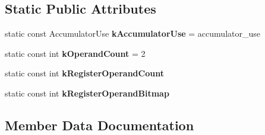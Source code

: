 \subsection*{Static Public Attributes}
\begin{DoxyCompactItemize}
\item 
static const Accumulator\+Use {\bfseries k\+Accumulator\+Use} = accumulator\+\_\+use\hypertarget{structv8_1_1internal_1_1interpreter_1_1_bytecode_traits_3_01accumulator__use_00_01operand__0_00_01operand__1_01_4_ae02e2452222dd06402907dcffd747ae4}{}\label{structv8_1_1internal_1_1interpreter_1_1_bytecode_traits_3_01accumulator__use_00_01operand__0_00_01operand__1_01_4_ae02e2452222dd06402907dcffd747ae4}

\item 
static const int {\bfseries k\+Operand\+Count} = 2\hypertarget{structv8_1_1internal_1_1interpreter_1_1_bytecode_traits_3_01accumulator__use_00_01operand__0_00_01operand__1_01_4_a8b8c6c8aadae9c3267245eef3e8ad1f2}{}\label{structv8_1_1internal_1_1interpreter_1_1_bytecode_traits_3_01accumulator__use_00_01operand__0_00_01operand__1_01_4_a8b8c6c8aadae9c3267245eef3e8ad1f2}

\item 
static const int {\bfseries k\+Register\+Operand\+Count}
\item 
static const int {\bfseries k\+Register\+Operand\+Bitmap}
\end{DoxyCompactItemize}


\subsection{Member Data Documentation}
